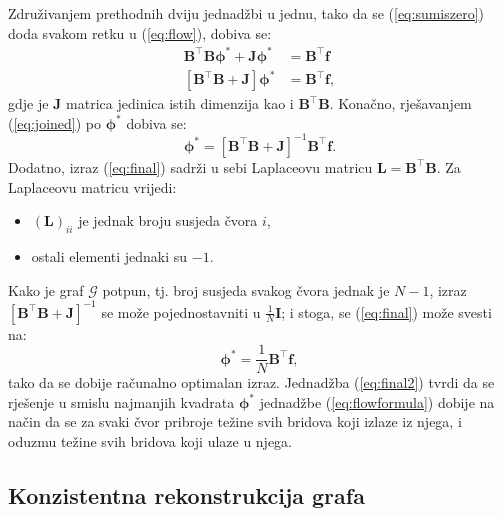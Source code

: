 \documentclass[lmodern, utf8, diplomski, numeric]{fer}
\newcommand{\matr}[1]{\mathbold{#1}}
\newcommand{\graph}[1]{\mathcal{#1}}
\newcommand{\T}{\top}
\begin{document}
  Združivanjem prethodnih dviju jednadžbi u jednu, tako da se (\ref{eq:sumiszero}) doda svakom retku u (\ref{eq:flow}), dobiva se:
  \begin{align}
  \matr{B}^\T \matr{B} \matr{\phi^*} + \matr{J} \matr{\phi^*} &= \matr{B}^\T \matr{f} \nonumber \\
  \label{eq:joined}
  \left[\matr{B}^\T \matr{B} + \matr{J} \right] \matr{\phi^*} &= \matr{B}^\T \matr{f},
  \end{align}
  gdje je $\matr{J}$ matrica jedinica istih dimenzija kao i $\matr{B}^\T \matr{B}$.
  Konačno, rješavanjem (\ref{eq:joined}) po $\matr{\phi^*}$ dobiva se:
  \begin{equation}
  \label{eq:final}
  \matr{\phi^*} = \left[\matr{B}^\T \matr{B} + \matr{J} \right]^{-1} \matr{B}^\T \matr{f}.
  \end{equation}
  Dodatno, izraz (\ref{eq:final}) sadrži u sebi Laplaceovu matricu $\matr{L} = \matr{B}^\T\matr{B}$.
  Za Laplaceovu matricu vrijedi:
  \begin{itemize}
    \item $(\matr{L})_{ii}$ je jednak broju susjeda čvora $i$,
    \item ostali elementi jednaki su $-1$.
  \end{itemize}
  Kako je graf $\graph{G}$ potpun, tj. broj susjeda svakog čvora jednak je $N - 1$, izraz $\left[ \matr{B}^\T \matr{B} + \matr{J} \right]^{-1}$ se može pojednostavniti u $\frac{1}{N} \matr{I}$; i stoga, se (\ref{eq:final}) može svesti na:
  \begin{equation}
  \label{eq:final2}
  \matr{\phi^*} = \frac{1}{N} \matr{B}^\T \matr{f},
  \end{equation}
  tako da se dobije računalno optimalan izraz.
  Jednadžba (\ref{eq:final2}) tvrdi da se rješenje u smislu najmanjih kvadrata $\matr{\phi^*}$ jednadžbe (\ref{eq:flowformula}) dobije na način da se za svaki čvor pribroje težine svih bridova koji izlaze iz njega, i oduzmu težine svih bridova koji ulaze u njega.
  
  \subsection{Konzistentna rekonstrukcija grafa}
  
\end{document}
